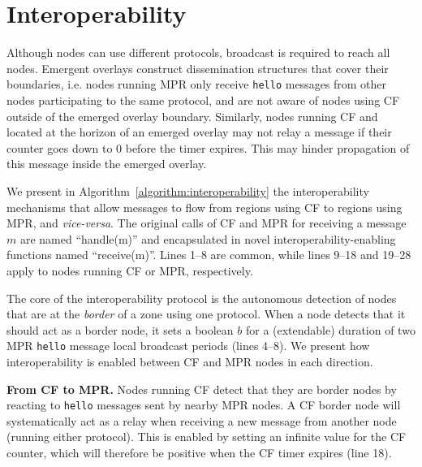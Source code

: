 
\section{Interoperability}
\label{sec:mechanisms}

Although nodes can use different protocols, broadcast is required to reach all nodes.
Emergent overlays construct dissemination structures that cover their boundaries, i.e. nodes running MPR only receive \texttt{hello} messages from other nodes participating to the same protocol, and are not aware of nodes using CF outside of the emerged overlay boundary.
Similarly, nodes running CF and located at the horizon of an emerged overlay may not relay a message if their counter goes down to 0 before the timer expires.
This may hinder propagation of this message inside the emerged overlay.

We present in Algorithm~\ref{algorithm:interoperability} the interoperability mechanisms that allow messages to flow from regions using CF to regions using  MPR, and \emph{vice-versa}.
The original calls of CF and MPR for receiving a message $m$ are named ``handle(m)'' and encapsulated in novel interoperability-enabling functions named ``receive(m)''.
Lines 1--8 are common, while lines 9--18 and 19--28 apply to nodes running CF or MPR, respectively.

The core of the interoperability protocol is the autonomous detection of nodes that are at the \emph{border} of a zone using one protocol.
When a node detects that it should act as a border node, it sets a boolean $b$ for a (extendable) duration of two MPR \texttt{hello} message local broadcast periods (lines 4--8).
We present how interoperability is enabled between CF and MPR nodes in each direction.



\smallskip
\noindent
\textbf{From CF to MPR.}
%
Nodes running CF detect that they are border nodes by reacting to \texttt{hello} messages sent by nearby MPR nodes.
A CF border node will systematically act as a relay when receiving a new message from another node (running either protocol).
This is enabled by setting an infinite value for the CF counter, which will therefore be positive when the CF timer expires (line 18).

